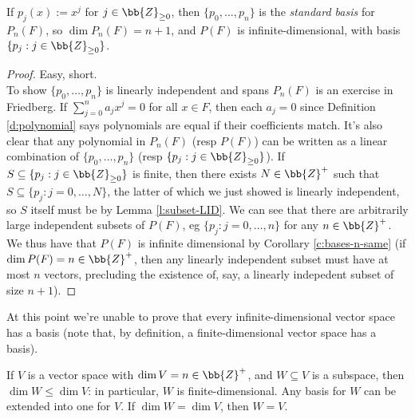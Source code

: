 \begin{lem}\label{l:polynomial-std-basis}
If $p_j(x):=x^j$ for $j \in \bb{Z}_{\geq 0}$, then $\{ p_0, \ldots, p_n \}$ is the \emph{standard basis} for $P_n(F)$, so $\dim P_n(F)=n+1$, and $P(F)$ is infinite-dimensional, with basis $\{ p_j:j \in \bb{Z}_{\geq 0}\}$.
\end{lem}
\begin{proof}
Easy, short.\\
To show $\{ p_0, \ldots,p_n \}$ is linearly independent and spans $P_n(F)$ is an exercise in Friedberg. If $\sum_{j=0}^na_jx^j=0$ for all $x \in F$, then each $a_j=0$ since Definition \ref{d:polynomial} says polynomials are equal if their coefficients match.
It's also clear that any polynomial in $P_n(F)$ (resp $P(F)$) can be written as a linear combination of $\{ p_0, \ldots,p_n \}$ (resp $\{ p_j:j \in \bb{Z}_{\geq 0}\}$).
If $S \subseteq \{ p_j:j \in \bb{Z}_{\geq 0}\}$ is finite, then there exists $N \in \bb{Z}^+$ such that $S \subseteq \{ p_j:j=0, \ldots,N \}$, the latter of which we just showed is linearly independent, so $S$ itself must be by Lemma \ref{l:subset-LID}. 
We can see that there are arbitrarily large independent subsets of $P(F)$, eg $\{ p_j:j=0, \ldots,n \}$ for any $n \in \bb{Z}^+$. We thus have that $P(F)$ is infinite dimensional by Corollary \ref{c:bases-n-same} (if $\dim P(F)=n \in \bb{Z}^+$, then any linearly independent subset must have at most $n$ vectors, precluding the existence of, say, a linearly indepedent subset of size $n+1$).
\end{proof}
At this point we're unable to prove that every infinite-dimensional vector space has a basis (note that, by definition, a finite-dimensional vector space has a  basis).
\begin{lem}\label{l:subspace-dim}
If $V$ is a vector space with $\dim V=n \in \bb{Z}^+$, and $W \subseteq V$ is a subspace, then $\dim W \leq \dim V$: in particular, $W$ is finite-dimensional. Any basis for $W$ can be extended into one for $V$. If $\dim W= \dim V$, then $W=V$.
\end{lem}
